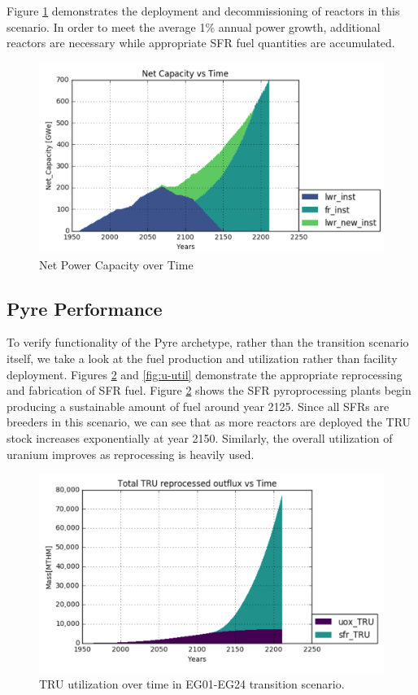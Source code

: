 Figure \ref{fig:net-cap} demonstrates the deployment and decommissioning of reactors in this scenario. In order to meet the average 1\% annual power growth, additional reactors are necessary
while appropriate SFR fuel quantities are accumulated.

\begin{figure} [h]
	\includegraphics[width=\linewidth]{images/transition-netcap}
	\caption{Net Power Capacity over Time}
	\label{fig:net-cap}
\end{figure}

\subsection{Pyre Performance}

To verify functionality of the Pyre archetype, rather than the transition scenario itself, we take a look at the fuel production and utilization rather than facility deployment.
Figures \ref{fig:TRU-util} and \ref{fig:u-util} demonstrate the appropriate reprocessing and fabrication of SFR fuel. Figure \ref{fig:TRU-util} shows the SFR pyroprocessing
plants begin producing a sustainable amount of fuel around year 2125. Since all SFRs are breeders in this scenario, we can see that as more reactors are deployed the TRU stock increases exponentially at year 2150. Similarly, the overall utilization of uranium improves as reprocessing is heavily used.

\begin{figure} [h]
	\includegraphics[width=\linewidth]{images/transition-TRUutil}
	\caption{TRU utilization over time in EG01-EG24 transition scenario.}
	\label{fig:TRU-util}
\end{figure}

